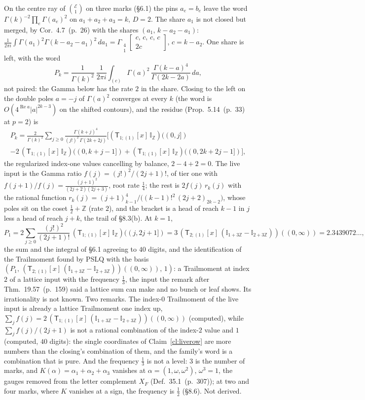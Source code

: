 \documentclass[11pt]{article}
\newcommand{\cE}{\mathcal E}
\newcommand{\sT}{\mathsf T}
\newcommand{\Gst}[4]{\Gamma_{\substack{#1\\#2}}\!\begin{bmatrix}#3\\#4\end{bmatrix}}
\newcommand{\IZ}{\mathbb I_{\mathbb Z}}
\newcommand{\Ilat}[1]{\mathbb I_{#1}}
\newcommand{\Tx}[3]{(\sT_{#1;(1)}[x]\,#2)((#3,\infty))}
\newcommand{\Th}[4]{(\sT_{#1;(1)}[x]\,#2)((#3,#4])}
\DeclareMathOperator{\re}{Re}
\newcommand{\hb}[2]{#1~(p.~#2)}   %
\theoremstyle{plain}
\theoremstyle{remark}
\begin{document}
On the centre ray of $\binom{\cE}1$ on three marks (\S6.1) the pins $a_e=b_e$ leave the word $\Gamma(k)^{-2}\prod_{e}\Gamma(a_e)^2$ on $a_1+a_2+a_3=k$, $D=2$. The share $a_1$ is not closed but merged, by Cor.~\hb{4.7}{26} with the shares $(a_1,\,k-a_2-a_1)$: $\frac1{2\pi i}\int\Gamma(a_1)^2\Gamma(k-a_2-a_1)^2\,da_1=\Gst41{c,\,c,\,c,\,c}{2c}$, $c=k-a_2$. One share is left, with the word
\[
P_k=\frac1{\Gamma(k)^2}\ \frac1{2\pi i}\int_{(c)}\Gamma(a)^2\,\frac{\Gamma(k-a)^4}{\Gamma(2k-2a)}\,da,
\]
not paired: the Gamma below has the rate $2$ in the share. Closing to the left on the double poles $a=-j$ of $\Gamma(a)^2$ converges at every $k$ (the word is $O(4^{\re a}|a|^{2k-3})$ on the shifted contours), and the residue (Prop.~\hb{5.14}{33} at $p=2$) is
\begin{multline*}
P_k=\frac{2}{\Gamma(k)^2}\sum_{j\ge0}\frac{\Gamma(k+j)^4}{(j!)^2\,\Gamma(2k+2j)}\Big[\Th{1}{\IZ}{0}{j}\\
-2\,\Th{1}{\IZ}{0}{k+j-1}+\Th{1}{\IZ}{0}{2k+2j-1}\Big],
\end{multline*}
the regularized index-one values cancelling by balance, $2-4+2=0$. The live input is the Gamma ratio $f(j)=(j!)^2/(2j+1)!$, of tier one with $f(j+1)/f(j)=\frac{(j+1)^2}{(2j+2)(2j+3)}$, root rate $\frac14$; the rest is $2f(j)\,r_k(j)$ with the rational function $r_k(j)=(j+1)_{k-1}^4\big/\big((k-1)!^2\,(2j+2)_{2k-2}\big)$, whose poles sit on the coset $\frac12+\mathbb Z$ (rate $2$), and the bracket is a head of reach $k-1$ in $j$ less a head of reach $j+k$, the trail of \S8.3(b). At $k=1$,
\[
P_1=2\sum_{j\ge0}\frac{(j!)^2}{(2j+1)!}\,\Th{1}{\IZ}{j}{2j+1}=3\,\Tx{2}{(\Ilat{1+3\mathbb Z}-\Ilat{2+3\mathbb Z})}{0}=2.3439072\ldots,
\]
the sum and the integral of \S6.1 agreeing to $40$ digits, and the identification of the Trailmoment found by PSLQ with the basis $(P_1,\,\Tx{2}{(\Ilat{1+3\mathbb Z}-\Ilat{2+3\mathbb Z})}{0},\,1)$: a Trailmoment at index $2$ of a lattice input with the frequency $\frac13$, the input the remark after Thm.~\hb{19.57}{159} said a lattice sum can make and no bunch or leaf shows. Its irrationality is not known. Two remarks. The index-$0$ Trailmoment of the live input is already a lattice Trailmoment one index up, $\sum_jf(j)=2\,\Tx{1}{(\Ilat{1+3\mathbb Z}-\Ilat{2+3\mathbb Z})}{0}$ (computed), while $\sum_jf(j)/(2j+1)$ is not a rational combination of the index-$2$ value and $1$ (computed, $40$ digits): the single coordinates of Claim~\ref{cl:liverow} are more numbers than the closing's combination of them, and the family's word is a combination that is pure. And the frequency $\frac13$ is not a level: $3$ is the number of marks, and $K(\alpha)=\alpha_1+\alpha_2+\alpha_3$ vanishes at $\alpha=(1,\omega,\omega^2)$, $\omega^3=1$, the gauges removed from the letter complement $X_F$ (Def.~\hb{35.1}{307}); at two and four marks, where $K$ vanishes at a sign, the frequency is $\frac12$ (\S8.6). Not derived.
\end{document}

